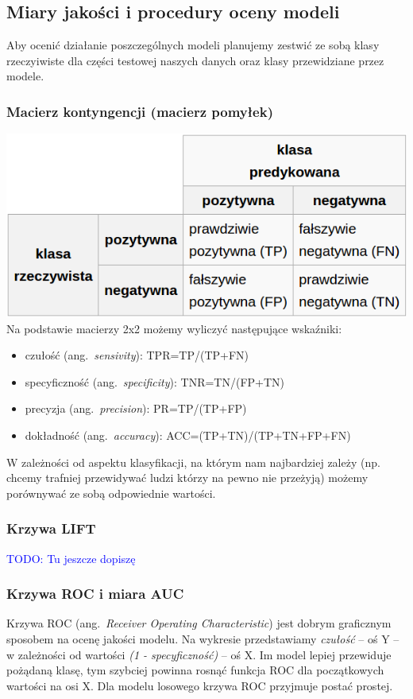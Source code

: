 \documentclass{article}
\newcommand{\TODO}[1]{\textcolor{blue}{TODO: #1}}
\newcommand{\ang}[1]{ang.~{\itshape #1}}
\begin{document}
\subsection{Miary jakości i procedury oceny modeli}
Aby ocenić działanie poszczególnych modeli planujemy zestwić ze sobą klasy rzeczyiwiste dla części testowej naszych danych oraz klasy przewidziane przez modele.

\subsubsection{Macierz kontyngencji (macierz pomyłek)}
\includegraphics[scale=0.5]{../pictures/tablicaPomylek}\\

Na podstawie macierzy 2x2 możemy wyliczyć następujące wskaźniki:
\begin{itemize}
\item czułość (\ang{sensivity}): TPR=TP/(TP+FN)
\item specyficzność (\ang{specificity}): TNR=TN/(FP+TN)
\item precyzja (\ang{precision}): PR=TP/(TP+FP)
\item dokładność (\ang{accuracy}): ACC=(TP+TN)/(TP+TN+FP+FN)
\end{itemize}

W zależności od aspektu klasyfikacji, na którym nam najbardziej zależy (np. chcemy trafniej przewidywać ludzi którzy na pewno nie przeżyją) możemy porównywać ze sobą odpowiednie wartości.

\subsubsection{Krzywa LIFT}
\TODO{Tu jeszcze dopiszę}

\subsubsection{Krzywa ROC i miara AUC}
Krzywa ROC (\ang{Receiver Operating Characteristic}) jest dobrym graficznym sposobem na ocenę jakości modelu. Na wykresie przedstawiamy {\itshape czułość} -- oś Y -- w zależności od wartości {\itshape (1 -  specyficzność)} -- oś X. Im model lepiej przewiduje pożądaną klasę, tym szybciej powinna rosnąć funkcja ROC dla początkowych wartości na osi X. Dla modelu losowego krzywa ROC przyjmuje postać prostej.
\end{document}
